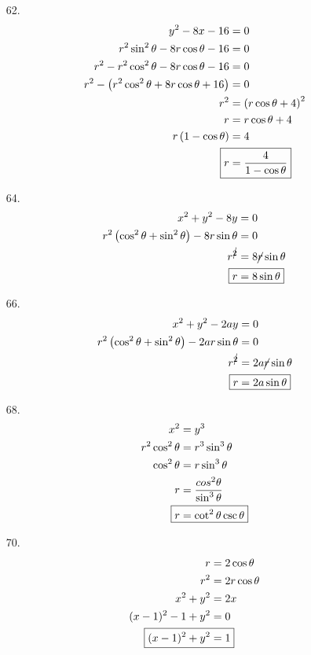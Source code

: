 \documentclass{article}
\begin{document}
\begin{multicols}{2}
\begin{itemize}
	\item[62.]
		\begin{align*}
			y^2-8x-16&=0 \\
			r^2\sin^2\theta-8r\cos\theta-16&=0 \\
			r^2-r^2\cos^2\theta-8r\cos\theta-16&=0 \\
			r^2-\left(r^2\cos^2\theta+8r\cos\theta+16\right)&=0 \\
			r^2&=\left(r\cos\theta+4\right)^2 \\
			r&=r\cos\theta+4 \\
			r\left(1-\cos\theta\right)&=4 \\
			\Aboxed{r&=\frac{4}{1-\cos\theta}}
		\end{align*}

	\item[64.]
		\begin{align*}
			x^2+y^2-8y&=0 \\
			r^2\left(\cos^2\theta+\sin^2\theta\right)-8r\sin\theta&=0 \\
			r^{\cancel{2}}&=8\cancel{r}\sin\theta \\
			\Aboxed{r&=8\sin\theta}
		\end{align*}

	\item[66.]
		\begin{align*}
			x^2+y^2-2ay&=0 \\
			r^2\left(\cos^2\theta+\sin^2\theta\right)-2ar\sin\theta&=0 \\
			r^{\cancel{2}}&=2a\cancel{r}\sin\theta \\
			\Aboxed{r&=2a\sin\theta}
		\end{align*}

	\item[68.]
		\begin{align*}
			x^2&=y^3 \\
			r^2\cos^2\theta&=r^3\sin^3\theta \\
			\cos^2\theta&=r\sin^3\theta \\
			r&=\frac{cos^2\theta}{\sin^3\theta} \\
			\Aboxed{r&=\cot^2\theta\csc\theta}
		\end{align*}

	\item[70.]
		\begin{align*}
			r&=2\cos\theta \\
			r^2&=2r\cos\theta \\
			x^2+y^2&=2x \\
			(x-1)^2-1+y^2&=0 \\
			\Aboxed{(x-1)^2+y^2&=1}
		\end{align*}


\end{itemize}
\end{multicols}
\end{document}
